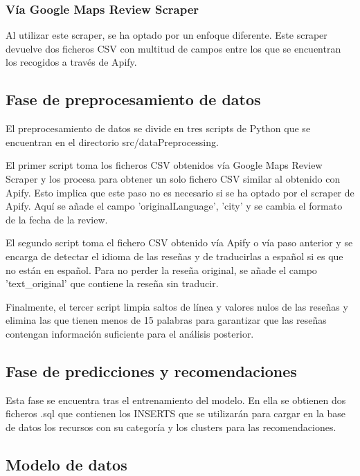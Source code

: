 \subsubsection{Vía Google Maps Review Scraper}

Al utilizar este scraper, se ha optado por un enfoque diferente. Este scraper devuelve dos ficheros CSV con multitud de campos entre los que se encuentran los recogidos a través de Apify.

\subsection{Fase de preprocesamiento de datos}

El preprocesamiento de datos se divide en tres scripts de Python que se encuentran en el directorio src/dataPreprocessing.

El primer script toma los ficheros CSV obtenidos vía Google Maps Review Scraper y los procesa para obtener un solo fichero CSV similar al obtenido con Apify.
Esto implica que este paso no es necesario si se ha optado por el scraper de Apify. Aquí se añade el campo 'originalLanguage', 'city' y se cambia el formato de la fecha de la review.

El segundo script toma el fichero CSV obtenido vía Apify o vía paso anterior y se encarga de detectar el idioma de las reseñas y de traducirlas a español si es que no están en español. 
Para no perder la reseña original, se añade el campo 'text\_original' que contiene la reseña sin traducir.

Finalmente, el tercer script limpia saltos de línea y valores nulos de las reseñas y elimina las que tienen menos de 15 palabras para 
garantizar que las reseñas contengan información suficiente para el análisis posterior.

\subsection{Fase de predicciones y recomendaciones}

Esta fase se encuentra tras el entrenamiento del modelo. En ella se obtienen dos ficheros .sql que contienen los 
INSERTS que se utilizarán para cargar en la base de datos los recursos con su categoría y los clusters para las recomendaciones.

\subsection{Modelo de datos}

